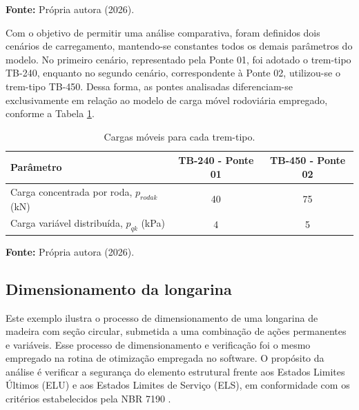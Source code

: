 \begin{table}[htpb!]
    \vspace{0.1cm}
    \par {\fontsize{11pt}{13.2pt}\selectfont \textbf{Fonte:} Própria autora (2026).}
\end{table}

Com o objetivo de permitir uma análise comparativa, foram definidos dois cenários de carregamento, mantendo-se constantes todos os demais parâmetros do modelo. No primeiro cenário, representado pela Ponte 01, foi adotado o trem-tipo TB-240, enquanto no segundo cenário, correspondente à Ponte 02, utilizou-se o trem-tipo TB-450. Dessa forma, as pontes analisadas diferenciam-se exclusivamente em relação ao modelo de carga móvel rodoviária empregado, conforme a Tabela \ref{tab:carregamento_variavel}.

\begin{table}[htpb!]
    \centering
    \caption{Cargas móveis para cada trem-tipo.}
    \label{tab:carregamento_variavel}

    \fontsize{11pt}{13.2pt}\selectfont
    \begin{tabular}{lcc}
        \toprule
        \textbf{Parâmetro} & \textbf{TB-240 - Ponte 01} & \textbf{TB-450 - Ponte 02} \\ \midrule
        Carga concentrada por roda, $p_{rodak}$ (kN) & 40 & 75 \\
        Carga variável distribuída, $p_{qk}$ (kPa)   & 4  & 5  \\ \bottomrule
    \end{tabular}

    \vspace{0.1cm}
    \par {\fontsize{11pt}{13.2pt}\selectfont \textbf{Fonte:} Própria autora (2026).}
\end{table}

\subsection{Dimensionamento da longarina}

Este exemplo ilustra o processo de dimensionamento de uma longarina de madeira com seção circular, submetida a uma combinação de ações permanentes e variáveis. Esse processo de dimensionamento e verificação foi o mesmo empregado na rotina de otimização empregada no software. O propósito da análise é verificar a segurança do elemento estrutural frente aos Estados Limites Últimos (ELU) e aos Estados Limites de Serviço (ELS), em conformidade com os critérios estabelecidos pela NBR 7190 \cite{NBR7190-1:2022}. 


